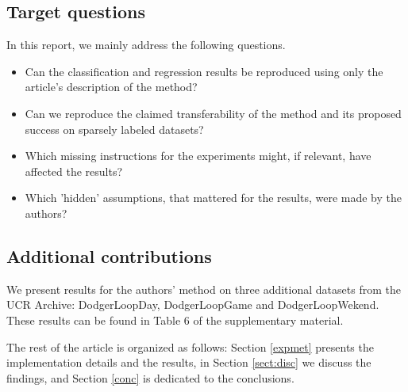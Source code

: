 
\subsection{Target questions}

In this report, we mainly address the following questions.

\begin{itemize}
    \item Can the classification and regression results be reproduced using only the article's description of the method?
    \item Can we reproduce the claimed transferability of the method and its proposed success on sparsely labeled datasets?
    \item Which missing instructions for the experiments might, if relevant, have affected the results?
    \item Which 'hidden' assumptions, that mattered for the results, were made by the authors?
    
\end{itemize}

\subsection{Additional contributions}
We present results for the authors' method on three additional datasets from the UCR Archive: DodgerLoopDay, DodgerLoopGame and DodgerLoopWekend. These results can be found in Table 6 of the supplementary material.

The rest of the article is organized as follows: Section \ref{expmet} presents the implementation details and the results, in Section \ref{sect:disc} we discuss the findings, and Section \ref{conc} is dedicated to the conclusions.

% 


